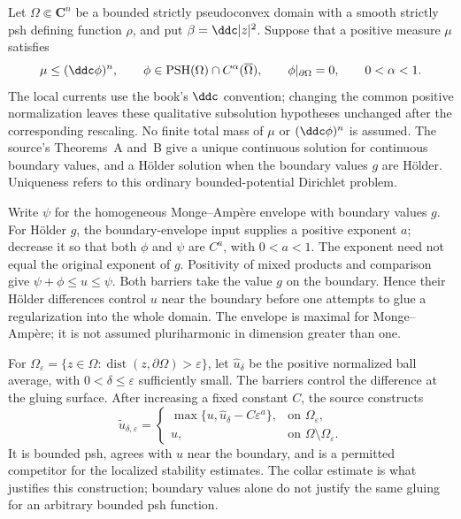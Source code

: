 Let $\Omega\Subset\mathbf C^n$ be a bounded strictly pseudoconvex
domain with a smooth strictly psh defining function $\rho$, and put
$\beta=\ddc|z|^2$. Suppose that a positive measure $\mu$ satisfies
\[
 \mu\leq(\ddc\phi)^n,
 \qquad \phi\in\operatorname{PSH}(\Omega)
                 \cap C^\alpha(\overline\Omega),
 \qquad \phi|_{\partial\Omega}=0,
 \qquad0<\alpha<1.
\]
The local currents use the book's $\ddc$ convention; changing
the common positive normalization leaves these qualitative
subsolution hypotheses unchanged after the corresponding rescaling.
No finite total mass of $\mu$ or $(\ddc\phi)^n$ is assumed.
The source's Theorems~A and~B give a unique continuous solution
for continuous boundary values, and a H\"older solution when the
boundary values $g$ are H\"older. Uniqueness refers to this
ordinary bounded-potential Dirichlet problem.

Write $\psi$ for the homogeneous Monge--Amp\`ere envelope with
boundary values $g$. For H\"older $g$, the boundary-envelope input
supplies a positive exponent $a$; decrease it so that both $\phi$
and $\psi$ are $C^a$, with $0<a<1$. The exponent need not equal
the original exponent of $g$. Positivity of mixed products and
comparison give $\psi+\phi\leq u\leq\psi$.
Both barriers take the value $g$ on the boundary. Hence their
H\"older differences control $u$ near the boundary before one
attempts to glue a regularization into the whole domain.
The envelope is maximal for Monge--Amp\`ere; it is not assumed
pluriharmonic in dimension greater than one.

For $\Omega_\varepsilon=
\{z\in\Omega:\operatorname{dist}(z,\partial\Omega)>\varepsilon\}$,
let $\widehat u_\delta$ be the positive normalized ball average,
with $0<\delta\leq\varepsilon$ sufficiently small.
The barriers control the difference at the gluing surface.
After increasing a fixed constant $C$, the source constructs
\[
\tag{68.23dj}\label{eq:ytd-boundary-regularization-glue}
 \widetilde u_{\delta,\varepsilon}=
 \begin{cases}
  \max\{u,\widehat u_\delta-C\varepsilon^a\},
                                  &\text{on }\Omega_\varepsilon,\\
  u,                              &\text{on }\Omega\setminus
                                                    \Omega_\varepsilon.
 \end{cases}
\]
It is bounded psh, agrees with $u$ near the boundary, and is a
permitted competitor for the localized stability estimates.
The collar estimate is what justifies this construction;
boundary values alone do not justify the same gluing for an
arbitrary bounded psh function.


